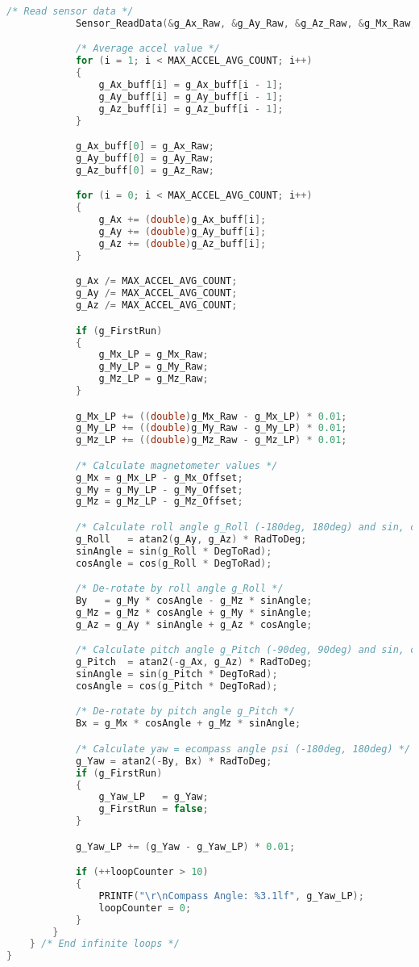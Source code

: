 \begin{lstlisting}[language=c,caption=Problem 5 main, label=list:p5_main]
            /* Read sensor data */
            Sensor_ReadData(&g_Ax_Raw, &g_Ay_Raw, &g_Az_Raw, &g_Mx_Raw, &g_My_Raw, &g_Mz_Raw);

            /* Average accel value */
            for (i = 1; i < MAX_ACCEL_AVG_COUNT; i++)
            {
                g_Ax_buff[i] = g_Ax_buff[i - 1];
                g_Ay_buff[i] = g_Ay_buff[i - 1];
                g_Az_buff[i] = g_Az_buff[i - 1];
            }

            g_Ax_buff[0] = g_Ax_Raw;
            g_Ay_buff[0] = g_Ay_Raw;
            g_Az_buff[0] = g_Az_Raw;

            for (i = 0; i < MAX_ACCEL_AVG_COUNT; i++)
            {
                g_Ax += (double)g_Ax_buff[i];
                g_Ay += (double)g_Ay_buff[i];
                g_Az += (double)g_Az_buff[i];
            }

            g_Ax /= MAX_ACCEL_AVG_COUNT;
            g_Ay /= MAX_ACCEL_AVG_COUNT;
            g_Az /= MAX_ACCEL_AVG_COUNT;

            if (g_FirstRun)
            {
                g_Mx_LP = g_Mx_Raw;
                g_My_LP = g_My_Raw;
                g_Mz_LP = g_Mz_Raw;
            }

            g_Mx_LP += ((double)g_Mx_Raw - g_Mx_LP) * 0.01;
            g_My_LP += ((double)g_My_Raw - g_My_LP) * 0.01;
            g_Mz_LP += ((double)g_Mz_Raw - g_Mz_LP) * 0.01;

            /* Calculate magnetometer values */
            g_Mx = g_Mx_LP - g_Mx_Offset;
            g_My = g_My_LP - g_My_Offset;
            g_Mz = g_Mz_LP - g_Mz_Offset;

            /* Calculate roll angle g_Roll (-180deg, 180deg) and sin, cos */
            g_Roll   = atan2(g_Ay, g_Az) * RadToDeg;
            sinAngle = sin(g_Roll * DegToRad);
            cosAngle = cos(g_Roll * DegToRad);

            /* De-rotate by roll angle g_Roll */
            By   = g_My * cosAngle - g_Mz * sinAngle;
            g_Mz = g_Mz * cosAngle + g_My * sinAngle;
            g_Az = g_Ay * sinAngle + g_Az * cosAngle;

            /* Calculate pitch angle g_Pitch (-90deg, 90deg) and sin, cos*/
            g_Pitch  = atan2(-g_Ax, g_Az) * RadToDeg;
            sinAngle = sin(g_Pitch * DegToRad);
            cosAngle = cos(g_Pitch * DegToRad);

            /* De-rotate by pitch angle g_Pitch */
            Bx = g_Mx * cosAngle + g_Mz * sinAngle;

            /* Calculate yaw = ecompass angle psi (-180deg, 180deg) */
            g_Yaw = atan2(-By, Bx) * RadToDeg;
            if (g_FirstRun)
            {
                g_Yaw_LP   = g_Yaw;
                g_FirstRun = false;
            }

            g_Yaw_LP += (g_Yaw - g_Yaw_LP) * 0.01;

            if (++loopCounter > 10)
            {
                PRINTF("\r\nCompass Angle: %3.1lf", g_Yaw_LP);
                loopCounter = 0;
            }
        }
    } /* End infinite loops */
}
\end{lstlisting}